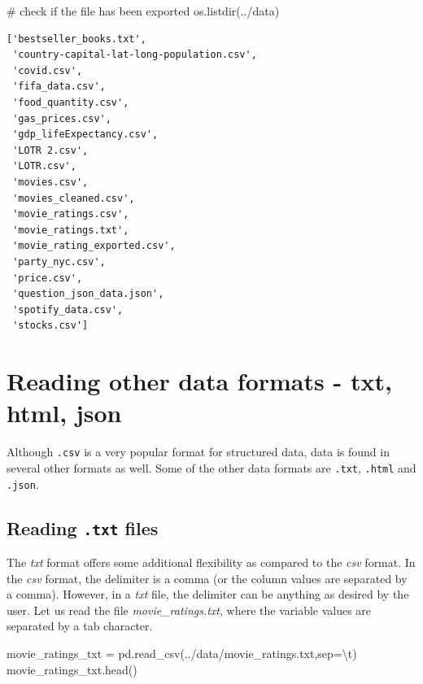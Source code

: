 \documentclass[
  letterpaper,
  DIV=11,
  numbers=noendperiod]{scrreprt}
\newenvironment{Shaded}{\begin{snugshade}}{\end{snugshade}}
\newcommand{\CharTok}[1]{\textcolor[rgb]{0.13,0.47,0.30}{#1}}
\newcommand{\CommentTok}[1]{\textcolor[rgb]{0.37,0.37,0.37}{#1}}
\newcommand{\NormalTok}[1]{\textcolor[rgb]{0.00,0.23,0.31}{#1}}
\newcommand{\OperatorTok}[1]{\textcolor[rgb]{0.37,0.37,0.37}{#1}}
\newcommand{\StringTok}[1]{\textcolor[rgb]{0.13,0.47,0.30}{#1}}
\begin{document}
\begin{Shaded}
\begin{Highlighting}[]
\CommentTok{\# check if the file has been exported}
\NormalTok{os.listdir(}\StringTok{\textquotesingle{}../data\textquotesingle{}}\NormalTok{)}
\end{Highlighting}
\end{Shaded}

\begin{verbatim}
['bestseller_books.txt',
 'country-capital-lat-long-population.csv',
 'covid.csv',
 'fifa_data.csv',
 'food_quantity.csv',
 'gas_prices.csv',
 'gdp_lifeExpectancy.csv',
 'LOTR 2.csv',
 'LOTR.csv',
 'movies.csv',
 'movies_cleaned.csv',
 'movie_ratings.csv',
 'movie_ratings.txt',
 'movie_rating_exported.csv',
 'party_nyc.csv',
 'price.csv',
 'question_json_data.json',
 'spotify_data.csv',
 'stocks.csv']
\end{verbatim}

\hypertarget{reading-other-data-formats---txt-html-json}{%
\section{Reading other data formats - txt, html,
json}\label{reading-other-data-formats---txt-html-json}}

Although \texttt{.csv} is a very popular format for structured data,
data is found in several other formats as well. Some of the other data
formats are \texttt{.txt}, \texttt{.html} and \texttt{.json}.

\hypertarget{reading-.txt-files}{%
\subsection{\texorpdfstring{Reading \texttt{.txt}
files}{Reading .txt files}}\label{reading-.txt-files}}

The \emph{txt} format offers some additional flexibility as compared to
the \emph{csv} format. In the \emph{csv} format, the delimiter is a
comma (or the column values are separated by a comma). However, in a
\emph{txt} file, the delimiter can be anything as desired by the user.
Let us read the file \emph{movie\_ratings.txt}, where the variable
values are separated by a tab character.

\begin{Shaded}
\begin{Highlighting}[]
\NormalTok{movie\_ratings\_txt }\OperatorTok{=}\NormalTok{ pd.read\_csv(}\StringTok{\textquotesingle{}../data/movie\_ratings.txt\textquotesingle{}}\NormalTok{,sep}\OperatorTok{=}\StringTok{\textquotesingle{}}\CharTok{\textbackslash{}t}\StringTok{\textquotesingle{}}\NormalTok{)}
\NormalTok{movie\_ratings\_txt.head()}
\end{Highlighting}
\end{Shaded}
\end{document}
